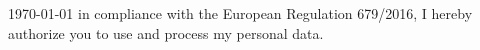 \documentclass[11pt, a4paper]{awesome-cv}
\begin{document}
\makecvheader[C]

\makecvfooter
  {\today}
  {}
  {in compliance with the European Regulation 679/2016, 
  I hereby authorize you to use and process my personal data.}


\vspace{-0.4cm}

\vspace{-0.45cm}

\vspace{-0.4cm}

\vspace{-0.4cm}

\vspace{-0.4cm}
% 
% 
% 

\vspace{-0.4cm}
% 

\end{document}
